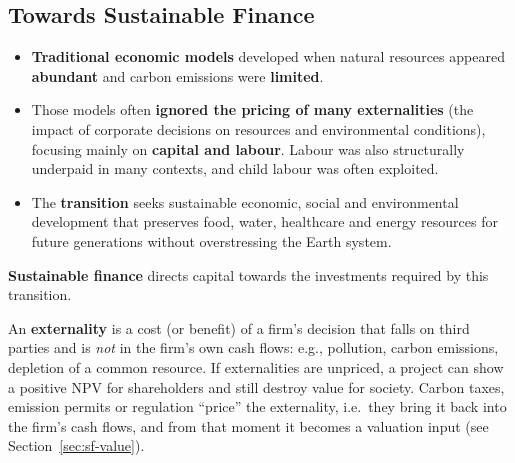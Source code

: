 \subsection{Towards Sustainable Finance}
\begin{itemize}
  \item \textbf{Traditional economic models} developed when natural resources appeared \textbf{abundant} and carbon emissions were \textbf{limited}.
  \item Those models often \textbf{ignored the pricing of many externalities} (the impact of corporate decisions on resources and environmental conditions), focusing mainly on \textbf{capital and labour}. Labour was also structurally underpaid in many contexts, and child labour was often exploited.
  \item The \textbf{transition} seeks sustainable economic, social and environmental development that preserves food, water, healthcare and energy resources for future generations without overstressing the Earth system.
\end{itemize}
\begin{keybox}
\textbf{Sustainable finance} directs capital towards the investments required by this transition.
\end{keybox}
\begin{addbox}
An \textbf{externality} is a cost (or benefit) of a firm's decision that falls on third parties and is \emph{not} in the firm's own cash flows: e.g., pollution, carbon emissions, depletion of a common resource. If externalities are unpriced, a project can show a positive NPV for shareholders and still destroy value for society. Carbon taxes, emission permits or regulation ``price'' the externality, i.e.\ they bring it back into the firm's cash flows, and from that moment it becomes a valuation input (see Section~\ref{sec:sf-value}).
\end{addbox}

